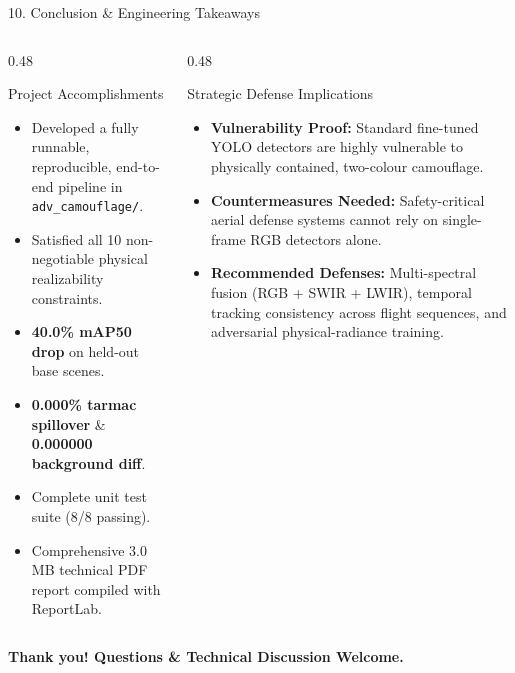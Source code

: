 \documentclass[aspectratio=169, 10pt]{beamer}
\begin{document}
\begin{frame}{10. Conclusion \& Engineering Takeaways}
\begin{columns}[T]
  \begin{column}{0.48\textwidth}
    \begin{block}{Project Accomplishments}\small
      \begin{itemize}
        \item Developed a fully runnable, reproducible, end-to-end pipeline in \texttt{adv\_camouflage/}.
        \item Satisfied all 10 non-negotiable physical realizability constraints.
        \item \textbf{40.0\% mAP50 drop} on held-out base scenes.
        \item \textbf{0.000\% tarmac spillover} & \textbf{0.000000 background diff}.
        \item Complete unit test suite (8/8 passing).
        \item Comprehensive 3.0 MB technical PDF report compiled with ReportLab.
      \end{itemize}
    \end{block}
  \end{column}

  \begin{column}{0.48\textwidth}
    \begin{exampleblock}{Strategic Defense Implications}\small
      \begin{itemize}
        \item \textbf{Vulnerability Proof:} Standard fine-tuned YOLO detectors are highly vulnerable to physically contained, two-colour camouflage.
        \item \textbf{Countermeasures Needed:} Safety-critical aerial defense systems cannot rely on single-frame RGB detectors alone.
        \item \textbf{Recommended Defenses:} Multi-spectral fusion (RGB + SWIR + LWIR), temporal tracking consistency across flight sequences, and adversarial physical-radiance training.
      \end{itemize}
    \end{exampleblock}
  \end{column}
\end{columns}

\vspace{0.3cm}
\begin{center}
  \textbf{Thank you! Questions \& Technical Discussion Welcome.}
\end{center}
\end{frame}
\end{document}

